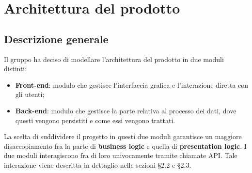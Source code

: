 \section{Architettura del prodotto}

\subsection{Descrizione generale}

Il gruppo \Omicron{} ha deciso di modellare l'architettura del prodotto in due moduli distinti:
\begin{itemize}
\item \textbf{Front-end}: modulo che gestisce l'interfaccia grafica e l'interazione diretta con gli utenti;
\item \textbf{Back-end}: modulo che gestisce la parte relativa al processo dei dati, dove questi vengono persistiti e come essi vengono trattati.
\end{itemize}

La scelta di suddividere il progetto in questi due moduli garantisce un maggiore disaccopiamento fra la parte di \textbf{business logic} e quella di \textbf{presentation logic}. I due moduli interagiscono fra di loro univocamente tramite chiamate API. Tale interazione viene descritta in dettaglio nelle sezioni \S{2.2} e \S{2.3}.



\newpage



